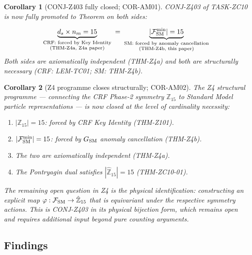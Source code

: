 \documentclass[12pt, a4paper]{article}
\newtheorem{corollary}{Corollary}[section]
\begin{document}
\begin{corollary}[CONJ-Z403 fully closed; COR-AM01]
\label{cor:conj-z403-closed}
CONJ-Z403 of TASK-ZC10 is now fully promoted to Theorem on both
sides:

\begin{keybox}[title={CONJ-Z403 $\to$ THM-Z403 (Two Independent Necessary Constraints)}]
\begin{equation}
  \underbrace{d_s \times n_m = 15}_{\substack{\text{CRF: forced by Key Identity} \\ \text{(THM-Z4a, Z4a paper)}}}
  \;=\;
  \underbrace{|\mathcal{F}_{\rm SM}^{\rm min}| = 15}_{\substack{\text{SM: forced by anomaly cancellation} \\ \text{(THM-Z4b, this paper)}}}
  \label{eq:conj-closed}
\end{equation}
Both sides are axiomatically independent (THM-Z4a) and both are
structurally necessary (CRF: LEM-TC01; SM: THM-Z4b).
\end{keybox}
\end{corollary}

\begin{corollary}[Z4 programme closes structurally; COR-AM02]
\label{cor:z4-closes}
The Z4 structural programme --- connecting the CRF Phase-2 symmetry
$\mathbb{Z}_{15}$ to Standard Model particle representations --- is
now closed at the level of \emph{cardinality necessity}:
\begin{enumerate}[leftmargin=*, noitemsep]
  \item $|\mathbb{Z}_{15}| = 15$: forced by CRF Key Identity (THM-Z101).
  \item $|\mathcal{F}_{\rm SM}^{\rm min}| = 15$: forced by $G_{\rm SM}$
    anomaly cancellation (THM-Z4b).
  \item The two are axiomatically independent (THM-Z4a).
  \item The Pontryagin dual satisfies $|\hat{\mathbb{Z}}_{15}| = 15$
    (THM-ZC10-01).
\end{enumerate}
The remaining open question in Z4 is the physical identification:
constructing an explicit map $\varphi: \mathcal{F}_{\rm SM} \to
\hat{\mathbb{Z}}_{15}$ that is equivariant under the respective
symmetry actions. This is CONJ-Z403 in its physical bijection form,
which remains open and requires additional input beyond pure
counting arguments.
\end{corollary}

\subsection{Findings}
\label{sec:findings}
\end{document}

